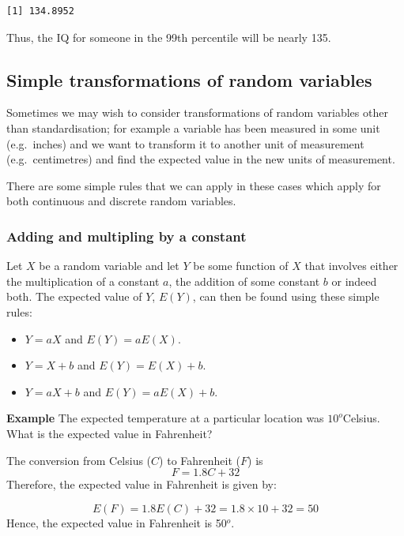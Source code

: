 \documentclass[
  oneside]{krantz}
\begin{document}
\begin{verbatim}
[1] 134.8952
\end{verbatim}

Thus, the IQ for someone in the 99th percentile will be nearly 135.

\hypertarget{simple-transformations-of-random-variables}{%
\subsection{Simple transformations of random variables}\label{simple-transformations-of-random-variables}}

Sometimes we may wish to consider transformations of random variables other than standardisation; for example a variable has been measured in some unit (e.g.~inches) and we want to transform it to another unit of measurement (e.g.~centimetres) and find the expected value in the new units of measurement.

There are some simple rules that we can apply in these cases which apply for both continuous and discrete random variables.

\hypertarget{adding-and-multipling-by-a-constant}{%
\subsubsection{Adding and multipling by a constant}\label{adding-and-multipling-by-a-constant}}

Let \(X\) be a random variable and let \(Y\) be some function of \(X\) that involves either the multiplication of a constant \(a\), the addition of some constant \(b\) or indeed both. The expected value of \(Y\), \(E(Y)\), can then be found using these simple rules:

\begin{itemize}
\item
  \(Y = aX\) and \(E(Y) = aE(X)\).
\item
  \(Y = X + b\) and \(E(Y) = E(X) + b\).
\item
  \(Y = aX + b\) and \(E(Y)= aE(X) + b\).
\end{itemize}

\textbf{Example} The expected temperature at a particular location was \(10^o\)Celsius. What is the expected value in Fahrenheit?

The conversion from Celsius (\(C\)) to Fahrenheit (\(F\)) is
\[ F = 1.8C + 32\]
Therefore, the expected value in Fahrenheit is given by:

\[E(F) = 1.8E(C) + 32 = 1.8 \times 10 + 32 = 50\]
Hence, the expected value in Fahrenheit is 50\(^o\).
\end{document}
